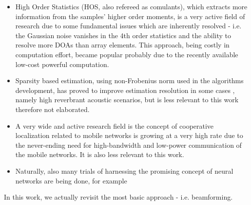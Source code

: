 \begin{itemize}
    \item High Order Statistics (HOS, also refereed as comulants), which extracts more information from the samples' higher order moments, is a very active field of research due to some fundamental issues which are inherently resolved - i.e. the Gaussian noise vanishes in the 4th order statistics and the ability to resolve more DOAs than array elements.
    This approach, being costly in computation effort, became popular probably due to the recently available low-cost powerful computation.
    \item Sparsity based estimation, using non-Frobenius norm used in the algorithms development, has proved to improve estimation resolution in some cases \cite{LocalizationOfMultipleSpeaker}, namely high reverbrant acoustic scenarios, but is less relevant to this work therefore not elaborated.
    \item A very wide and active research field is the concept of cooperative localization related to mobile networks is growing at a very high rate due to the never-ending need for high-bandwidth and low-power communication of the mobile networks.
    It is also less relevant to this work.
    \item Naturally, also many trials of harnessing the promising concept of neural networks are being done, for example \cite{NNDOA}
\end{itemize}
In this work, we actually revisit the most basic approach - i.e. beamforming.